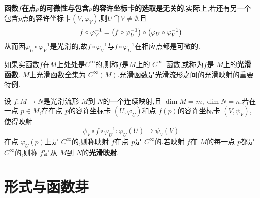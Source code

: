 {\bf 函数$f$在点$p$的可微性与包含$p$的容许坐标卡的选取是无关的}.实际上,若还有另一个包含$p$点的容许坐标卡$(V,\varphi_V)$,则$U\bigcap V\neq \emptyset$,且
\[f\circ\varphi_V^{-1}=\left(f\circ\varphi_U^{-1}\right)\circ\left(\varphi_U\circ\varphi_V^{-1}\right)\]
从而因$\varphi_U\circ\varphi_V^{-1}$是光滑的,故$f\circ\varphi_V^{-1}$与$f\circ\varphi_U^{-1}$在相应点都是可微的.

如果实函数$f$在$M$上处处是$C^\infty$的,则称$f$是$M$上的 $C^\infty$--函数,或称为$f$是 $M$上的\textbf{光滑函数}. $M$上光滑函数全集为 $C^\infty (M)$.光滑函数是光滑流形之间的光滑映射的重要特例.

\begin{definition}
设 $f\colon M\to N$是光滑流形 $M$到 $N$的一个连续映射,且 $\dim M=m,\dim N=n$.若在一点 $p\in M$,存在点 $p$的容许坐标卡 $(U,\varphi_U)$和点 $f(p)$的容许坐标卡 $(V,\psi_V)$,使得映射
\[
  \psi_V \circ f\circ \varphi_U^{-1}\colon \varphi_U (U)\to \psi_V (V)
\]
在点 $\varphi_U (p)$上是 $C^\infty$的,则称映射 $f$在点 $p$是 $C^\infty$的.若映射 $f$在 $M$的每一点 $p$都是 $C^\infty$的,则称 $f$是从 $M$到 $N$的\textbf{光滑映射}.
\end{definition}
\section{形式与函数芽}
